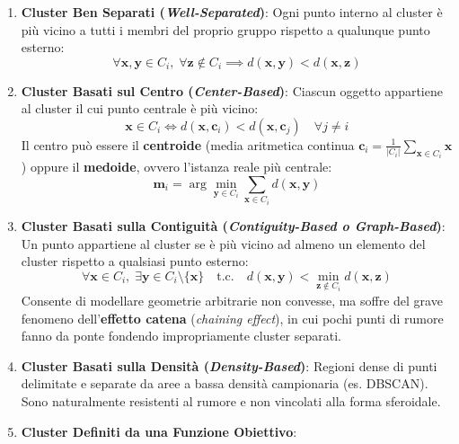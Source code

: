\begin{enumerate}
    \item \textbf{Cluster Ben Separati (\textit{Well-Separated})}:
    Ogni punto interno al cluster è più vicino a tutti i membri del proprio gruppo rispetto a qualunque punto esterno:
    \begin{equation}
        \forall \mathbf{x}, \mathbf{y} \in C_i, \; \forall \mathbf{z} \notin C_i \implies d(\mathbf{x}, \mathbf{y}) < d(\mathbf{x}, \mathbf{z})
    \end{equation}
    \item \textbf{Cluster Basati sul Centro (\textit{Center-Based})}:
    Ciascun oggetto appartiene al cluster il cui punto centrale è più vicino:
    \begin{equation}
        \mathbf{x} \in C_i \iff d(\mathbf{x}, \mathbf{c}_i) < d(\mathbf{x}, \mathbf{c}_j) \quad \forall j \neq i
    \end{equation}
    Il centro può essere il \textbf{centroide} (media aritmetica continua $\mathbf{c}_i = \frac{1}{|C_i|} \sum_{\mathbf{x} \in C_i} \mathbf{x}$) oppure il \textbf{medoide}, ovvero l'istanza reale più centrale:
    \begin{equation}
        \mathbf{m}_i = \arg\min_{\mathbf{y} \in C_i} \sum_{\mathbf{x} \in C_i} d(\mathbf{x}, \mathbf{y})
    \end{equation}
    \item \textbf{Cluster Basati sulla Contiguità (\textit{Contiguity-Based o Graph-Based})}:
    Un punto appartiene al cluster se è più vicino ad almeno un elemento del cluster rispetto a qualsiasi punto esterno:
    \begin{equation}
        \forall \mathbf{x} \in C_i, \; \exists \mathbf{y} \in C_i \setminus \{\mathbf{x}\} \quad \text{t.c.} \quad d(\mathbf{x}, \mathbf{y}) < \min_{\mathbf{z} \notin C_i} d(\mathbf{x}, \mathbf{z})
    \end{equation}
    Consente di modellare geometrie arbitrarie non convesse, ma soffre del grave fenomeno dell'\textbf{effetto catena} (\textit{chaining effect}), in cui pochi punti di rumore fanno da ponte fondendo impropriamente cluster separati.
    \item \textbf{Cluster Basati sulla Densità (\textit{Density-Based})}:
    Regioni dense di punti delimitate e separate da aree a bassa densità campionaria (es. DBSCAN). Sono naturalmente resistenti al rumore e non vincolati alla forma sferoidale.
    \item \textbf{Cluster Definiti da una Funzione Obiettivo}:

\end{enumerate}

